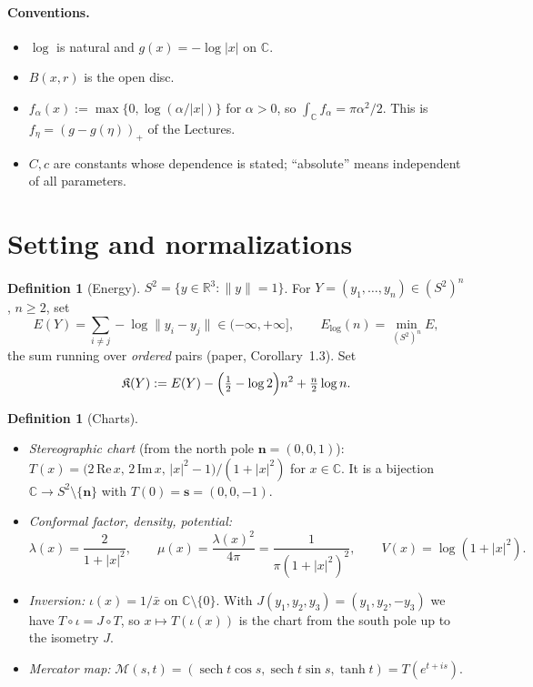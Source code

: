 \documentclass[11pt]{article}
\theoremstyle{definition}
\newtheorem{definition}[theorem]{Definition}
\theoremstyle{remark}
\newcommand{\R}{\mathbb R}
\newcommand{\C}{\mathbb C}
\begin{document}
\paragraph{Conventions.}
\begin{itemize}[leftmargin=*]
\item $\log$ is natural and $g(x)=-\log|x|$ on $\C$.
\item $B(x,r)$ is the open disc.
\item $f_\alpha(x):=\max\{0,\log(\alpha/|x|)\}$ for $\alpha>0$, so
  $\int_\C f_\alpha=\pi\alpha^2/2$. This is $f_\eta=(g-g(\eta))_+$ of the Lectures.
\item $C,c$ are constants whose dependence is stated; ``absolute'' means independent of all
  parameters.
\end{itemize}

\section{Setting and normalizations}\label{sec:setting}

\begin{definition}[Energy]\label{def:energy}
$S^2=\{y\in\R^3:\|y\|=1\}$. For $Y=(y_1,\dots,y_n)\in(S^2)^n$, $n\ge2$, set
\[
E(Y)=\sum_{i\neq j}-\log\|y_i-y_j\|\in(-\infty,+\infty],
\qquad E_{\log}(n)=\min_{(S^2)^n}E,
\]
the sum running over \emph{ordered} pairs (paper, Corollary~1.3). Set
\[
\mathfrak K(Y):=E(Y)-\Bigl(\tfrac12-\log2\Bigr)n^2+\tfrac n2\log n .
\]
\end{definition}

\begin{definition}[Charts]\label{def:charts}
\begin{itemize}[leftmargin=*]
\item \emph{Stereographic chart} (from the north pole $\mathbf n=(0,0,1)$):
  $T(x)=\bigl(2\,\mathrm{Re}\,x,\,2\,\mathrm{Im}\,x,\,|x|^2-1\bigr)/(1+|x|^2)$ for $x\in\C$.
  It is a bijection $\C\to S^2\setminus\{\mathbf n\}$ with $T(0)=\mathbf s=(0,0,-1)$.
\item \emph{Conformal factor, density, potential:}
  \[
  \lambda(x)=\frac{2}{1+|x|^2},\qquad
  \mu(x)=\frac{\lambda(x)^2}{4\pi}=\frac{1}{\pi(1+|x|^2)^2},\qquad
  V(x)=\log(1+|x|^2).
  \]
\item \emph{Inversion:} $\iota(x)=1/\bar x$ on $\C\setminus\{0\}$. With
  $J(y_1,y_2,y_3)=(y_1,y_2,-y_3)$ we have $T\circ\iota=J\circ T$, so $x\mapsto T(\iota(x))$ is
  the chart from the south pole up to the isometry $J$.
\item \emph{Mercator map:}
  $\mathcal M(s,t)=(\operatorname{sech}t\cos s,\operatorname{sech}t\sin s,\tanh t)
  =T(e^{t+is})$.
\end{itemize}
\end{definition}
\end{document}
